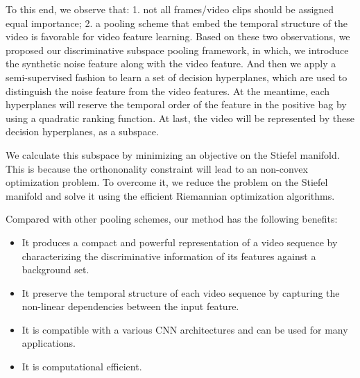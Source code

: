 \documentclass[runningheads]{llncs}
\begin{document}
{To this end, we observe that: 1. not all frames/video clips should be assigned equal importance; 2. a pooling scheme that embed the temporal structure of the video is favorable for video feature learning. Based on these two observations, we proposed our discriminative subspace pooling framework, in which, we introduce the synthetic noise feature along with the video feature. And then we apply a semi-supervised fashion to learn a set of decision hyperplanes, which are used to distinguish the noise feature from the video features. At the meantime, each hyperplanes will reserve the temporal order of the feature in the positive bag by using a quadratic ranking function. At last, the video will be represented by these decision hyperplanes, as a subspace.

We calculate this subspace by minimizing an objective on the Stiefel manifold. This is because the orthononality constraint will lead to an non-convex optimization problem. To overcome it, we reduce the problem on the Stiefel manifold and solve it using the efficient Riemannian optimization algorithms.

Compared with other pooling schemes, our method has the following benefits: 
\begin{itemize}
\item It produces a compact and powerful representation of a video sequence by characterizing the discriminative information of its features against a background set.
\item It preserve the temporal structure of each video sequence by capturing the non-linear dependencies between the input feature.
\item It is compatible with a various CNN architectures and can be used for many applications.
\item It is computational efficient. 
\end{itemize}
}
\end{document}
